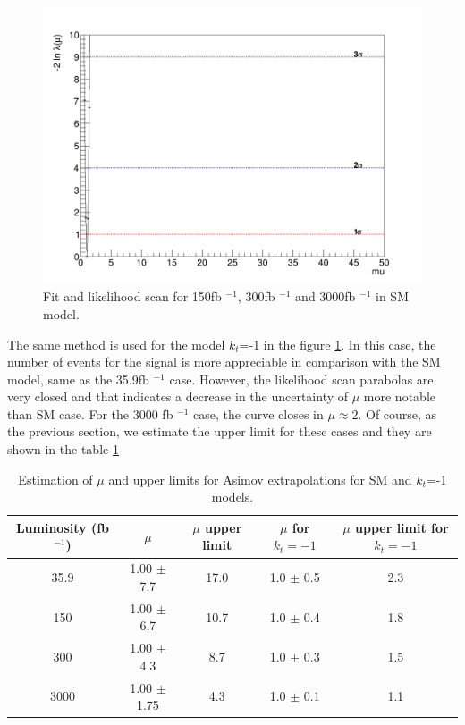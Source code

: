 \begin{linenumbers}
\begin{figure}[!htbp]
\begin{minipage}[b]{0.48\textwidth}
		\includegraphics[width=\textwidth]{Chapter4/kt-1/3000fb/Likelihood.png}
	\end{minipage}
	\caption{Fit and likelihood scan for 150fb $^{-1}$, 300fb $^{-1}$ and 3000fb $^{-1}$ in SM model.}
	\label{hm1}
\end{figure}
The same method is used for the model $k_t$=-1 in the figure \ref{hm1}. In this case, the number of events for the signal is more appreciable in comparison with the SM model, same as the 35.9fb $^{-1}$ case. However, the likelihood scan parabolas are very closed and that indicates a decrease in the uncertainty of $\mu$ more notable than SM case. For the 3000 fb $^{-1}$ case, the curve closes in $\mu \approx $2. 
Of course, as the previous section, we estimate the upper limit for these cases and they are shown in the table \ref{upper}

\begin{table}[ht!]
	\caption{Estimation of $\mu$ and upper limits for Asimov extrapolations for SM and $k_t$=-1 models.}
	\begin{tabular}{|c|c|c|c|c|}
		\hline
		Luminosity (fb $^{-1}$)	&$\mu$ &$\mu$ upper limit    &   $\mu$ for $k_t=-1$ &$\mu$ upper limit for $k_t=-1$ \\
		\hline
		35.9 & 1.00 $\pm$  7.7 &  17.0  & 1.0 $\pm$  0.5 & 2.3  \\
		\hline
		150& 1.00 $\pm$  6.7& 10.7  &  1.0 $\pm$  0.4 &1.8\\
		\hline
		300&1.00 $\pm$  4.3 &8.7 &  1.0 $\pm$  0.3 &1.5 \\
		\hline
		3000&1.00 $\pm$  1.75 & 4.3  &	 1.0 $\pm$  0.1 & 1.1\\
		\hline
	\end{tabular}
\label{upper}
\end{table}


\end{linenumbers}
